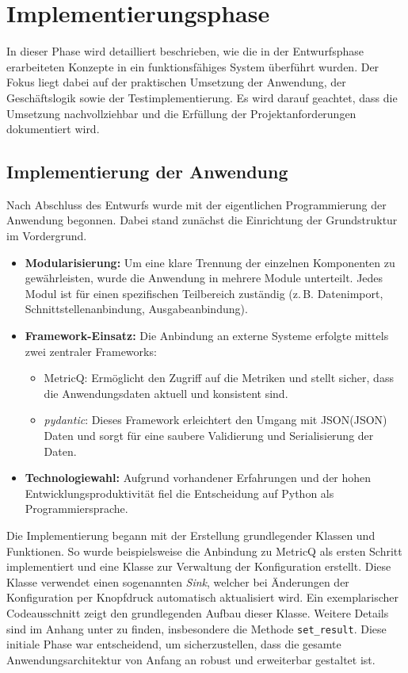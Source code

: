 \section{Implementierungsphase}
In dieser Phase wird detailliert beschrieben, wie die in der Entwurfsphase erarbeiteten Konzepte in ein funktionsfähiges System überführt wurden.
Der Fokus liegt dabei auf der praktischen Umsetzung der Anwendung, der Geschäftslogik sowie der Testimplementierung.
Es wird darauf geachtet, dass die Umsetzung nachvollziehbar und die Erfüllung der Projektanforderungen dokumentiert wird.

\subsection{Implementierung der Anwendung}
Nach Abschluss des Entwurfs wurde mit der eigentlichen Programmierung der Anwendung begonnen.
Dabei stand zunächst die Einrichtung der Grundstruktur im Vordergrund.

\begin{itemize}
  \item \textbf{Modularisierung:} Um eine klare Trennung der einzelnen Komponenten zu gewährleisten, wurde die Anwendung in mehrere Module unterteilt.
    Jedes Modul ist für einen spezifischen Teilbereich zuständig (z.\,B. Datenimport, Schnittstellenanbindung, Ausgabeanbindung).
  \item \textbf{Framework-Einsatz:} Die Anbindung an externe Systeme erfolgte mittels zwei zentraler Frameworks:
    \begin{itemize}
      \item \Gls{MetricQ}: Ermöglicht den Zugriff auf die Metriken und stellt sicher, dass die Anwendungsdaten aktuell und konsistent sind.
      \item \textit{pydantic}: Dieses Framework erleichtert den Umgang mit \acrlong{JSON}(\acrshort{JSON}) Daten und sorgt für eine saubere Validierung und Serialisierung der Daten.
    \end{itemize}
  \item \textbf{Technologiewahl:} Aufgrund vorhandener Erfahrungen und der hohen Entwicklungsproduktivität fiel die Entscheidung auf Python als Programmiersprache.
\end{itemize}

\noindent
Die Implementierung begann mit der Erstellung grundlegender Klassen und Funktionen.
So wurde beispielsweise die Anbindung zu \Gls{MetricQ} als ersten Schritt implementiert und eine Klasse zur Verwaltung der Konfiguration erstellt.
Diese Klasse verwendet einen sogenannten \textit{Sink}, welcher bei Änderungen der Konfiguration per Knopfdruck automatisch aktualisiert wird.
Ein exemplarischer Codeausschnitt zeigt den grundlegenden Aufbau dieser Klasse.
Weitere Details sind im Anhang unter  zu finden, insbesondere die Methode \texttt{set\_result}.
Diese initiale Phase war entscheidend, um sicherzustellen, dass die gesamte Anwendungsarchitektur von Anfang an robust und erweiterbar gestaltet ist.

